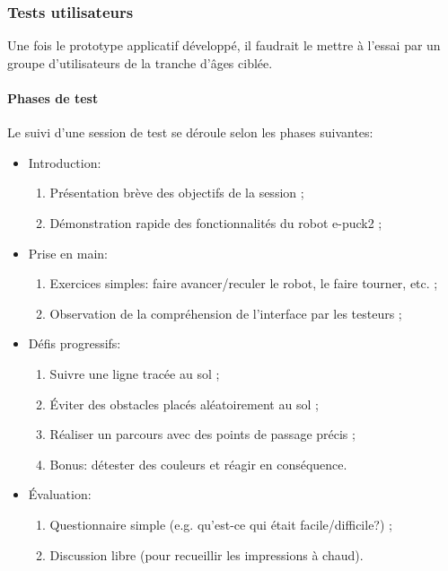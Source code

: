 \subsubsection{Tests utilisateurs}

Une fois le prototype applicatif développé, il faudrait le mettre à l'essai par un groupe d'utilisateurs de la tranche d'âges ciblée.

\paragraph{Phases de test}
Le suivi d'une session de test se déroule selon les phases suivantes:
\begin{itemize}
    \item Introduction:
        \begin{enumerate}
            \item Présentation brève des objectifs de la session ;
            \item Démonstration rapide des fonctionnalités du robot e-puck2 ;
        \end{enumerate}

    \item Prise en main:
        \begin{enumerate}
            \item Exercices simples: faire avancer/reculer le robot, le faire tourner, etc. ;
            \item Observation de la compréhension de l'interface par les testeurs ;
        \end{enumerate}

    \item Défis progressifs:
        \begin{enumerate}
            \item Suivre une ligne tracée au sol ;
            \item Éviter des obstacles placés aléatoirement au sol ;
            \item Réaliser un parcours avec des points de passage précis ;
            \item Bonus: détester des couleurs et réagir en conséquence.
        \end{enumerate}

    \item Évaluation: 
        \begin{enumerate}
            \item Questionnaire simple (e.g. qu'est-ce qui était facile/difficile?) ;
            \item Discussion libre (pour recueillir les impressions à chaud).
        \end{enumerate}
\end{itemize}

